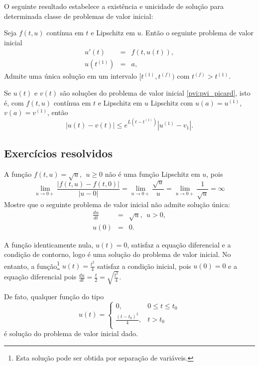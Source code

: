 O seguinte resultado estabelece a existência e unicidade de solução para determinada classe de problemas de valor inicial:
\begin{teo} Seja $f(t, u)$ contínua em $t$ e Lipschitz em $u$. Então o seguinte problema de valor inicial
\begin{eqnarray}\label{pvi:pvi_picard}
  u'(t)  &=& f(t, u(t)), \\
  u(t^{(1)}) &=& a,
\end{eqnarray}
Admite uma única solução em um intervalo $[t^{(1)},t^{(f)})$ com $t^{(f)}>t^{(1)}.$
\end{teo}


\begin{teo}
Se $u(t)$ e $v(t)$ são soluções do problema de valor inicial \eqref{pvi:pvi_picard}, isto é, com $f(t, u)$ contínua em $t$ e Lipschitz em $u$ Lipschitz com $u(a)=u^{(1)}$, $v(a)=v^{(1)}$, então
$$ |u(t)-v(t)| \leq  e^{L(t-t^{(1)})}|u^{(1)}-v_1| . $$
\end{teo}

\subsection*{Exercícios resolvidos}

\begin{exeresol} A função $f(t,u)=\sqrt{u},~~u\geq 0$ não é uma função Lipschitz em $u$, pois
$$\lim_{u\to 0+} \frac{|f(t,u)-f(t,0)|}{|u-0|}=\lim_{u\to 0+} \frac{\sqrt{u}}{u}=\lim_{u\to 0+} \frac{1}{\sqrt{u}}=\infty$$
 Mostre que o seguinte problema de valor inicial não admite solução única:
\begin{eqnarray}
   \frac{du}{dt} &=&\sqrt{u},~~u>0,\\
            u(0) &=& 0.
\end{eqnarray}
\end{exeresol}
\begin{resol}
 A função identicamente nula, $u(t)=0$, satisfaz a equação diferencial e a condição de contorno, logo é uma solução do problema de valor inicial. No entanto, a função\footnote{Esta solução pode ser obtida por separação de variáveis.} $u(t)=\frac{t^2}{4}$ satisfaz a condição inicial, pois $u(0)=0$ e a equação diferencial pois $\frac{du}{dt}=\frac{t}{2}=\sqrt{\frac{t^2}{4}}$.
 
 De fato, qualquer função do tipo
 $$u(t)=\left\{
 \begin{array}{ll}
  0,&0\leq t \leq t_0\\
  \frac{(t-t_0)^2}{4},& t >t_0\\
 \end{array}
 \right.$$
 é solução do problema de valor inicial dado.
\end{resol}



